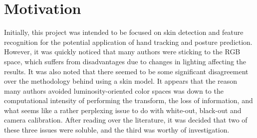 
\chapter{Motivation}  %

\ifpdf
    \graphicspath{{Chapter1/Figs/Raster/}{Chapter1/Figs/PDF/}{Chapter1/Figs/}}
\else
    \graphicspath{{Chapter1/Figs/Vector/}{Chapter1/Figs/}}
\fi

Initially, this project was intended to be focused on skin detection and feature recognition for the potential application of hand tracking and posture prediction. However, it was quickly noticed that many authors were sticking to the RGB space, which suffers from disadvantages due to changes in lighting affecting the results. It was also noted that there seemed to be some significant disagreement over the methodology behind using a skin model. It appears that the reason many authors avoided luminosity-oriented color spaces was down to the computational intensity of performing the transform, the loss of information, and what seems like a rather perplexing issue to do with white-out, black-out and camera calibration. After reading over the literature, it was decided that two of these three issues were soluble, and the third was worthy of investigation.










